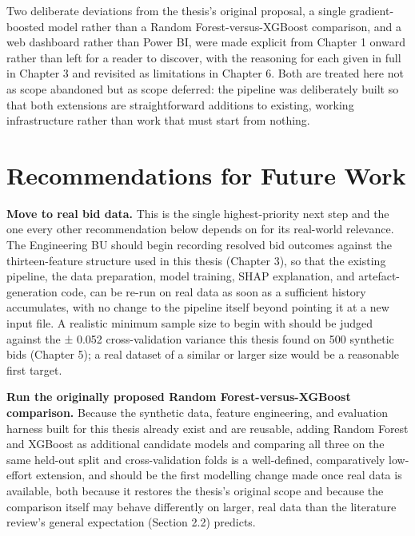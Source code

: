 Two deliberate deviations from the thesis's original proposal, a single
gradient-boosted model rather than a Random Forest-versus-XGBoost
comparison, and a web dashboard rather than Power BI, were made explicit
from Chapter 1 onward rather than left for a reader to discover, with
the reasoning for each given in full in Chapter 3 and revisited as
limitations in Chapter 6. Both are treated here not as scope abandoned
but as scope deferred: the pipeline was deliberately built so that both
extensions are straightforward additions to existing, working
infrastructure rather than work that must start from nothing.

\hypertarget{recommendations-for-future-work}{%
\section{Recommendations for Future
Work}\label{recommendations-for-future-work}}

\textbf{Move to real bid data.} This is the single highest-priority next
step and the one every other recommendation below depends on for its
real-world relevance. The Engineering BU should begin recording resolved
bid outcomes against the thirteen-feature structure used in this thesis
(Chapter 3), so that the existing pipeline, the data preparation, model
training, SHAP explanation, and artefact-generation code, can be re-run
on real data as soon as a sufficient history accumulates, with no change
to the pipeline itself beyond pointing it at a new input file. A
realistic minimum sample size to begin with should be judged against the
± 0.052 cross-validation variance this thesis found on 500 synthetic
bids (Chapter 5); a real dataset of a similar or larger size would be a
reasonable first target.

\textbf{Run the originally proposed Random Forest-versus-XGBoost
comparison.} Because the synthetic data, feature engineering, and
evaluation harness built for this thesis already exist and are reusable,
adding Random Forest \citep{breiman2001random} and XGBoost
\citep{chen2016xgboost} as additional candidate models and comparing all
three on the same held-out split and cross-validation folds is a
well-defined, comparatively low-effort extension, and should be the
first modelling change made once real data is available, both because it
restores the thesis's original scope and because the comparison itself
may behave differently on larger, real data than the literature review's
general expectation (Section 2.2) predicts.

